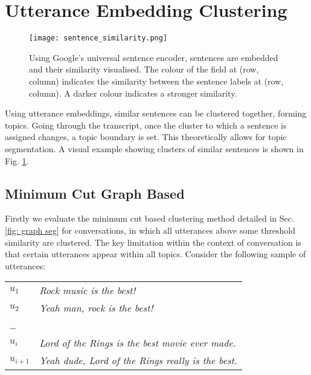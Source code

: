\section[Clustering]{Utterance Embedding Clustering \label{method: utterance embedding clustering}}
    \begin{figure}[t]
        \centering
        \texttt{[image: sentence\_similarity.png]}
        \caption{Using Google's universal sentence encoder, sentences are embedded and their similarity visualised. The colour of the field at (row, column) indicates the similarity between the sentence labels at (row, column). A darker colour indicates a stronger similarity.}
        \label{fig:sentence similarity}
    \end{figure}
    Using \gls{utterance} \glspl{embedding}, similar sentences can be clustered together, forming topics. Going through the transcript, once the cluster to which a sentence is assigned changes, a topic boundary is set. This theoretically allows for topic segmentation. A visual example showing clusters of similar sentences is shown in Fig. \ref{fig:sentence similarity}.

    \subsection{Minimum Cut Graph Based \label{method: minimum cut}}

        Firstly we evaluate the minimum cut based clustering method detailed in Sec. \ref{fig: graph seg} for conversations, in which all \glspl{utterance} above some threshold similarity are clustered. The key limitation within the context of conversation is that certain \glspl{utterance} appear within all topics. Consider the following sample of \glspl{utterance}:
        \begin{table}[h]
            \begin{tabular}{l|l}
            $u_1$     & \textit{Rock music is the best!}                        \\
            $u_2$     & \textit{Yeah man, rock is the best!}                    \\
            \dots      &                                                         \\
            $u_i$     & \textit{Lord of the Rings is the best movie ever made.} \\
            $u_{i+1}$ & \textit{Yeah dude, Lord of the Rings really is the best.}              \\
            \end{tabular}
        \end{table}

